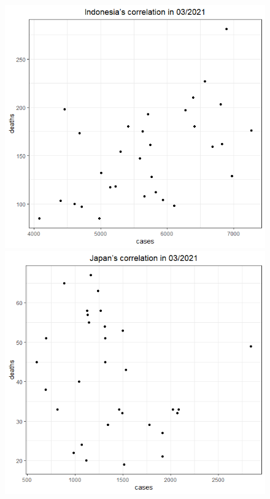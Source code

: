\documentclass[a4paper]{article}
\theoremstyle{definition}
\begin{document}
\begin{enumerate}[1)]
\begin{figure}[H]
\begin{center}
        \includegraphics[scale = 0.3]{ix/ix.2/IDN_03_2021.png}
        \includegraphics[scale = 0.3]{ix/ix.2/JPN_03_2021.png}
        

\end{center}
\end{figure}
\end{enumerate}
\end{document}

